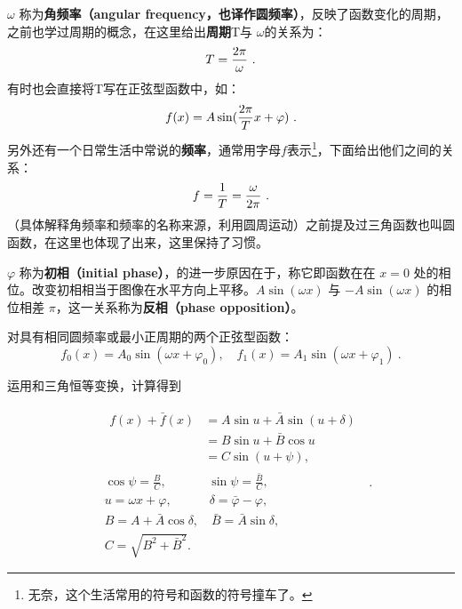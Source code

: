 
\item $\omega$ 称为\textbf{角频率（angular frequency，也译作圆频率）}，反映了函数变化的周期，之前也学过周期的概念，在这里给出\textbf{周期}T与 $\omega$的关系为：
\begin{equation}
T={2\pi\over\omega}~.
\end{equation}
有时也会直接将T写在正弦型函数中，如：
\begin{equation}
f(x) = A\sin({2\pi\over T} x + \varphi)~.
\end{equation}
另外还有一个日常生活中常说的\textbf{频率}，通常用字母$f$表示\footnote{无奈，这个生活常用的符号和函数的符号撞车了。}，下面给出他们之间的关系：
\begin{equation}
f={1\over T}={\omega\over2\pi}~.
\end{equation}
（具体解释角频率和频率的名称来源，利用圆周运动）之前提及过三角函数也叫圆函数，在这里也体现了出来，这里保持了习惯。
\item $\varphi$ 称为\textbf{初相（initial phase）}，的进一步原因在于，称它即函数在在 $x=0$ 处的相位。改变初相相当于图像在水平方向上平移。$A\sin(\omega x)$ 与 $-A\sin(\omega x)$ 的相位相差 $\pi$，这一关系称为\textbf{反相（phase opposition）}。


对具有相同圆频率或最小正周期的两个正弦型函数：
\begin{equation}
f_0\left(x\right)=A_0\sin\left(\omega x+\varphi_0\right),\quad f_1\left(x\right)=A_1\sin\left(\omega x+\varphi_1\right)~.
\end{equation}

运用和三角恒等变换，计算得到

\begin{equation}
\begin{split}&\begin{split}f\left(x\right)+\bar f\left(x\right)&=A\sin u+\bar A\sin\left(u+\delta\right)\\&=B\sin u+\bar B\cos u\\&=C\sin\left(u+\psi\right),\end{split}\\&\cos\psi=\frac BC,\qquad\quad\,\, \sin\psi=\frac{\bar B}{C},\\&u=\omega x+\varphi,\qquad\quad \delta=\bar\varphi-\varphi,\\&B=A+\bar A\cos\delta,\quad\bar B=\bar A\sin\delta,\\&C=\sqrt{B^2+\bar B^2}.\end{split}~.
\end{equation}

